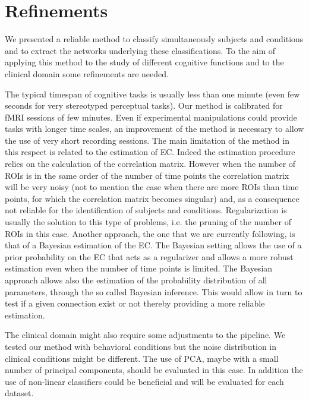 \documentclass[12pt, a4paper, final, fleqn]{article}
\begin{document}
\section{Refinements}
\label{dynEC}

We presented a reliable method to classify simultaneously subjects and conditions and to extract 
the networks underlying these classifications.
To the aim of applying this method to the study of different cognitive functions and to the clinical domain some refinements are needed.

The typical timespan of cognitive tasks is usually less than one minute (even few seconds for very stereotyped perceptual
tasks). Our method is calibrated for fMRI sessions of few minutes. Even if experimental manipulations could provide
tasks with longer time scales, an improvement of the method is necessary to allow the use of very short recording sessions.
The main limitation of the method in this respect is related to the estimation of EC. Indeed the estimation procedure relies on the calculation of
the correlation matrix. However when the number of ROIs is in the same order of the number of time points the correlation matrix will be
very noisy (not to mention the case when there are more ROIs than time points,
for which the correlation matrix becomes singular) and, as a consequence not
reliable for the identification of subjects and conditions.
Regularization is usually the solution to this type of problems, i.e. the pruning of the number of ROIs in this case.
Another approach, the one that we are currently following, is that of a Bayesian estimation of the EC. The Bayesian setting allows the use of
a prior probability on the EC that acts as a regularizer and allows a more robust estimation even when the number of time points is limited.
The Bayesian approach allows also the estimation of the probability distribution of all parameters, through the so called Bayesian inference.
This would allow in turn to test if a given connection exist or not thereby providing a more reliable estimation.

The clinical domain might also require some adjustments to the pipeline. We tested our method with behavioral conditions but the noise distribution
in clinical conditions might be different. The use of PCA, maybe with a small number of principal components, should be evaluated in this case.
In addition the use of non-linear classifiers could be beneficial and will be evaluated for each dataset.



\end{document}
